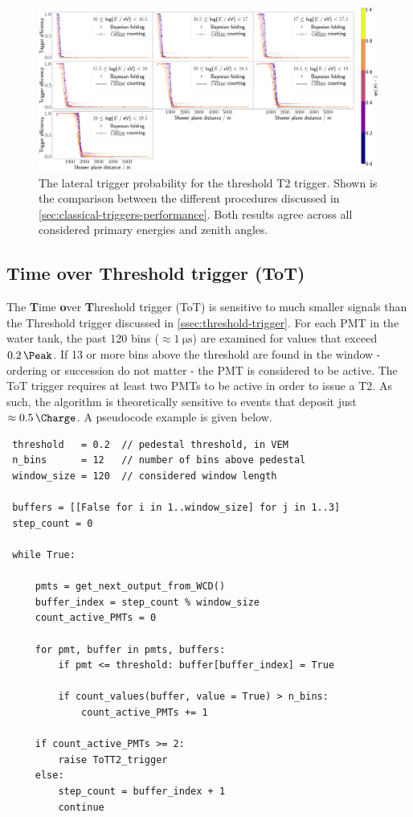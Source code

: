 \begin{figure}
	\centering
	\includegraphics[width=\textwidth]{./plots/th2_LTP_comparison.png}
	\caption{The lateral trigger probability for the threshold T2 trigger. Shown is the comparison between the different procedures discussed in 
	\autoref{sec:classical-triggers-performance}. Both results agree across all considered primary energies and zenith angles.} 
	\label{fig:th2-ltp-comparison}
\end{figure}

\subsection{Time over Threshold trigger (ToT)}
\label{ssec:time-over-threshold-trigger}

The \textbf{T}ime \textbf{o}ver \textbf{T}hreshold trigger (ToT) is sensitive to much smaller signals than the Threshold trigger discussed in 
\autoref{ssec:threshold-trigger}. For each PMT in the water tank, the past 120 bins ($\approx \SI{1}{\micro\second}$) are examined for values that exceed 
$\SI{0.2}{\Peak}$. If 13 or more bins above the threshold are found in the window - ordering or succession do not matter - the PMT is considered to be active. The
ToT trigger requires at least two PMTs to be active in order to issue a T2. As such, the algorithm is theoretically sensitive to events that deposit just 
$\approx\SI{0.5}{\Charge}$. A pseudocode example is given below.

\begin{lstlisting}
 threshold   = 0.2  // pedestal threshold, in VEM
 n_bins      = 12   // number of bins above pedestal
 window_size = 120  // considered window length

 buffers = [[False for i in 1..window_size] for j in 1..3] 
 step_count = 0

 while True:

     pmts = get_next_output_from_WCD()
     buffer_index = step_count % window_size
     count_active_PMTs = 0

     for pmt, buffer in pmts, buffers:
         if pmt <= threshold: buffer[buffer_index] = True

         if count_values(buffer, value = True) > n_bins:
             count_active_PMTs += 1

     if count_active_PMTs >= 2:
         raise ToTT2_trigger
     else:
         step_count = buffer_index + 1
         continue
\end{lstlisting}

